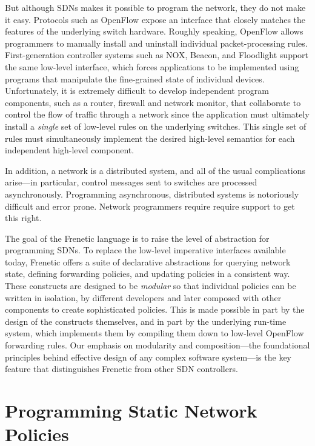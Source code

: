 \documentclass{article}
\begin{document}
But although SDNs makes it possible to program the network, they do
not make it easy. Protocols such as OpenFlow expose an interface that
closely matches the features of the underlying switch
hardware. Roughly speaking, OpenFlow allows programmers to manually
install and uninstall individual packet-processing rules.
First-generation controller systems such as NOX, Beacon, and
Floodlight support the same low-level interface, which forces
applications to be implemented using programs that manipulate the
fine-grained state of individual devices.  Unfortunately, it is
extremely difficult to develop independent program components, such as
a router, firewall and network monitor, that collaborate to control
the flow of traffic through a network since the application must
ultimately install a \emph{single} set of low-level rules on the underlying
switches.  This single set of rules must simultaneously implement the
desired high-level semantics for each independent high-level
component.

In addition, a network is a distributed system, and all of the usual
complications arise—in particular, control messages sent to switches
are processed asynchronously. Programming asynchronous, distributed
systems is notoriously difficult and error prone.  Network programmers
require require support to get this right.

The goal of the Frenetic language is to raise the level of abstraction
for programming SDNs. To replace the low-level imperative interfaces
available today, Frenetic offers a suite of declarative abstractions
for querying network state, deﬁning forwarding policies, and updating
policies in a consistent way.  These constructs are designed to be
\emph{modular} so that individual policies can be written in isolation, by
different developers and later composed with other components to
create sophisticated policies. This is made possible in part by the
design of the constructs themselves, and in part by the underlying
run-time system, which implements them by compiling them down to
low-level OpenFlow forwarding rules.  Our emphasis on modularity and
composition—the foundational principles behind effective design of any
complex software system—is the key feature that distinguishes Frenetic
from other SDN controllers.

\section{Programming Static Network Policies}
\end{document}
